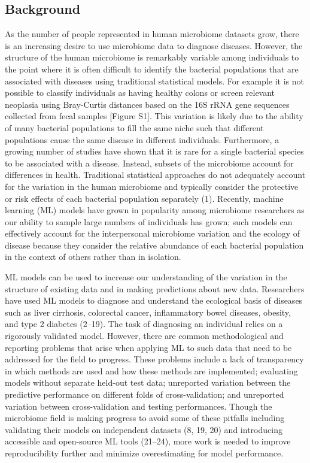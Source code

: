 \documentclass[11pt,]{article}
\begin{document}
\newpage

\subsection{Background}\label{background}

As the number of people represented in human microbiome datasets grow,
there is an increasing desire to use microbiome data to diagnose
diseases. However, the structure of the human microbiome is remarkably
variable among individuals to the point where it is often difficult to
identify the bacterial populations that are associated with diseases
using traditional statistical models. For example it is not possible to
classify individuals as having healthy colons or screen relevant
neoplasia using Bray-Curtis distances based on the 16S rRNA gene
sequences collected from fecal samples {[}Figure S1{]}. This variation
is likely due to the ability of many bacterial populations to fill the
same niche such that different populations cause the same disease in
different individuals. Furthermore, a growing number of studies have
shown that it is rare for a single bacterial species to be associated
with a disease. Instead, subsets of the microbiome account for
differences in health. Traditional statistical approaches do not
adequately account for the variation in the human microbiome and
typically consider the protective or risk effects of each bacterial
population separately (1). Recently, machine learning (ML) models have
grown in popularity among microbiome researchers as our ability to
sample large numbers of individuals has grown; such models can
effectively account for the interpersonal microbiome variation and the
ecology of disease because they consider the relative abundance of each
bacterial population in the context of others rather than in isolation.

ML models can be used to increase our understanding of the variation in
the structure of existing data and in making predictions about new data.
Researchers have used ML models to diagnose and understand the
ecological basis of diseases such as liver cirrhosis, colorectal cancer,
inflammatory bowel diseases, obesity, and type 2 diabetes (2--19). The
task of diagnosing an individual relies on a rigorously validated model.
However, there are common methodological and reporting problems that
arise when applying ML to such data that need to be addressed for the
field to progress. These problems include a lack of transparency in
which methods are used and how these methods are implemented; evaluating
models without separate held-out test data; unreported variation between
the predictive performance on different folds of cross-validation; and
unreported variation between cross-validation and testing performances.
Though the microbiome field is making progress to avoid some of these
pitfalls including validating their models on independent datasets (8,
19, 20) and introducing accessible and open-source ML tools (21--24),
more work is needed to improve reproducibility further and minimize
overestimating for model performance.
\end{document}
